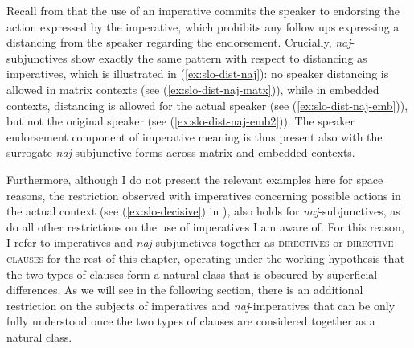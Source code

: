 \documentclass[output=paper,colorlinks,citecolor=brown]{langscibook}
\begin{document}
Recall from  that the use of an imperative commits the speaker to endorsing the action expressed by the imperative, which prohibits any follow ups expressing a distancing from the speaker regarding the endorsement.
Crucially, \emph{naj}-subjunctives show exactly the same pattern with respect to distancing as imperatives, which is illustrated in (\ref{ex:slo-dist-naj}): no speaker distancing is allowed in matrix contexts (see (\ref{ex:slo-dist-naj-matx})), while in embedded contexts, distancing is allowed for the actual speaker (see (\ref{ex:slo-dist-naj-emb})), but not the original speaker (see (\ref{ex:slo-dist-naj-emb2})).
\ea {}\label{ex:slo-dist-naj}
\z\z 
The speaker endorsement component of imperative meaning is thus present also with the surrogate \emph{naj}-subjunctive forms across matrix and embedded contexts. 

Furthermore, although I do not present the relevant examples here for space reasons, the restriction observed with imperatives concerning possible actions in the actual context (see (\ref{ex:slo-decisive}) in ), also holds for \emph{naj}-subjunctives, as do all other restrictions on the use of imperatives I am aware of. For this reason, I refer to imperatives and \emph{naj}-subjunctives together as \textsc{directives} or \textsc{directive clauses} for the rest of this chapter, operating under the working hypothesis that the two types of clauses form a natural class that is obscured by superficial differences. As we will see in the following section, there is an additional restriction on the subjects of imperatives and \emph{naj}-imperatives that can be only fully understood once the two types of clauses are considered together as a natural class. 
\end{document}
